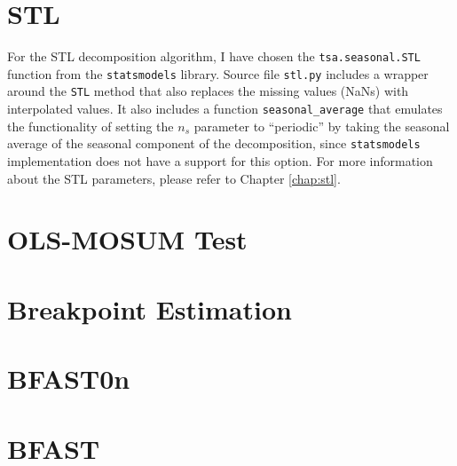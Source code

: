 \documentclass[main.tex]{subfiles}
\begin{document}
\section{STL}
\label{sec:impl_stl}
For the STL decomposition algorithm, I have chosen the \texttt{tsa.seasonal.STL} function
from the \texttt{statsmodels} library. Source file \texttt{stl.py} includes a
wrapper around the \texttt{STL} method that also replaces the missing values
(NaNs) with interpolated values. It also includes a function 
\texttt{seasonal\_average} that emulates the functionality of
setting the $n_s$ parameter to ``periodic'' by taking the seasonal average of
the seasonal component of the decomposition, since \texttt{statsmodels}
implementation does not have a support for this option. For more information
about the STL parameters, please refer to Chapter \ref{chap:stl}.

\section{OLS-MOSUM Test}
\label{sec:impl_mosum}



\section{Breakpoint Estimation}
\label{sec:impl_breakpoints}

\section{BFAST0n}
\label{sec:impl_bfast0n}

\section{BFAST}
\label{sec:bfast}

\biblio
\end{document}
